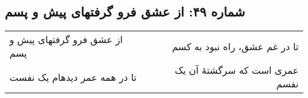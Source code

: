\begin{center}
\section*{شماره ۴۹: از عشق فرو گرفتهای پیش و پسم}
\label{sec:049}
\begin{longtable}{l p{0.5cm} r}
از عشق فرو گرفتهای پیش و پسم
&&
تا در غم عشق، راه نبود به کسم
\\
تا در همه عمر دیدهام یک نفست
&&
عمری است که سرگشتهٔ آن یک نفسم
\\
\end{longtable}
\end{center}
